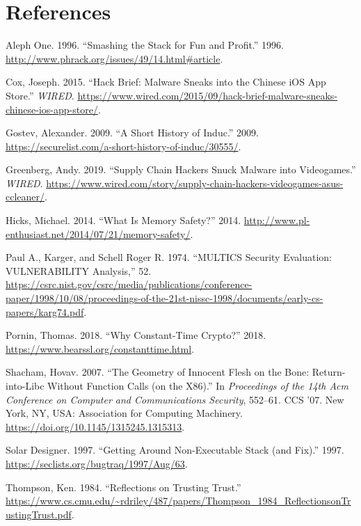 \documentclass[a4paper,]{report}
\begin{document}
\printindex

\listoftodos

\hypertarget{references}{%
\chapter*{References}\label{references}}

\hypertarget{refs}{}
\leavevmode\hypertarget{ref-AlephOne1996}{}%
Aleph One. 1996. ``Smashing the Stack for Fun and Profit.'' 1996.
\url{http://www.phrack.org/issues/49/14.html\#article}.

\leavevmode\hypertarget{ref-Cox2015}{}%
Cox, Joseph. 2015. ``Hack Brief: Malware Sneaks into the Chinese iOS App
Store.'' \emph{WIRED}.
\url{https://www.wired.com/2015/09/hack-brief-malware-sneaks-chinese-ios-app-store/}.

\leavevmode\hypertarget{ref-Gostev2009}{}%
Gostev, Alexander. 2009. ``A Short History of Induc.'' 2009.
\url{https://securelist.com/a-short-history-of-induc/30555/}.

\leavevmode\hypertarget{ref-Greenberg2019}{}%
Greenberg, Andy. 2019. ``Supply Chain Hackers Snuck Malware into
Videogames.'' \emph{WIRED}.
\url{https://www.wired.com/story/supply-chain-hackers-videogames-asus-ccleaner/}.

\leavevmode\hypertarget{ref-Hicks2014}{}%
Hicks, Michael. 2014. ``What Is Memory Safety?'' 2014.
\url{http://www.pl-enthusiast.net/2014/07/21/memory-safety/}.

\leavevmode\hypertarget{ref-Karger1974}{}%
Paul A., Karger, and Schell Roger R. 1974. ``MULTICS Security
Evaluation: VULNERABILITY Analysis,'' 52.
\url{https://csrc.nist.gov/csrc/media/publications/conference-paper/1998/10/08/proceedings-of-the-21st-nissc-1998/documents/early-cs-papers/karg74.pdf}.

\leavevmode\hypertarget{ref-Pornin2018}{}%
Pornin, Thomas. 2018. ``Why Constant-Time Crypto?'' 2018.
\url{https://www.bearssl.org/constanttime.html}.

\leavevmode\hypertarget{ref-Shacham2007}{}%
Shacham, Hovav. 2007. ``The Geometry of Innocent Flesh on the Bone:
Return-into-Libc Without Function Calls (on the X86).'' In
\emph{Proceedings of the 14th Acm Conference on Computer and
Communications Security}, 552--61. CCS '07. New York, NY, USA:
Association for Computing Machinery.
\url{https://doi.org/10.1145/1315245.1315313}.

\leavevmode\hypertarget{ref-Solar1997}{}%
Solar Designer. 1997. ``Getting Around Non-Executable Stack (and Fix).''
1997. \url{https://seclists.org/bugtraq/1997/Aug/63}.

\leavevmode\hypertarget{ref-Thompson1984}{}%
Thompson, Ken. 1984. ``Reflections on Trusting Trust.''
\url{https://www.cs.cmu.edu/~rdriley/487/papers/Thompson_1984_ReflectionsonTrustingTrust.pdf}.
\end{document}
